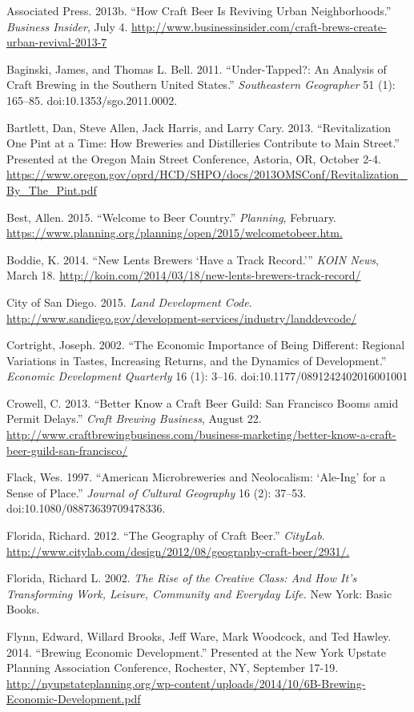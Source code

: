 \documentclass[]{article}
\begin{document}
Associated Press. 2013b. ``How Craft Beer Is Reviving Urban
Neighborhoods.'' \emph{Business Insider}, July 4.
\url{http://www.businessinsider.com/craft-brews-create-urban-revival-2013-7}

Baginski, James, and Thomas L. Bell. 2011. ``Under-Tapped?: An Analysis
of Craft Brewing in the Southern United States.'' \emph{Southeastern
Geographer} 51 (1): 165--85. doi:10.1353/sgo.2011.0002.

Bartlett, Dan, Steve Allen, Jack Harris, and Larry Cary. 2013.
``Revitalization One Pint at a Time: How Breweries and Distilleries
Contribute to Main Street.'' Presented at the Oregon Main Street
Conference, Astoria, OR, October 2-4.
\url{https://www.oregon.gov/oprd/HCD/SHPO/docs/2013OMSConf/Revitalization\_By\_The\_Pint.pdf}

Best, Allen. 2015. ``Welcome to Beer Country.'' \emph{Planning},
February. \url{https://www.planning.org/planning/open/2015/welcometobeer.htm.}

Boddie, K. 2014. ``New Lents Brewers `Have a Track Record.''' \emph{KOIN
News}, March 18.
\url{http://koin.com/2014/03/18/new-lents-brewers-track-record/}

City of San Diego. 2015. \emph{Land Development Code}.
\url{http://www.sandiego.gov/development-services/industry/landdevcode/}

Cortright, Joseph. 2002. ``The Economic Importance of Being Different:
Regional Variations in Tastes, Increasing Returns, and the Dynamics of
Development.'' \emph{Economic Development Quarterly} 16 (1): 3--16.
doi:10.1177/0891242402016001001

Crowell, C. 2013. ``Better Know a Craft Beer Guild: San Francisco Booms
amid Permit Delays.'' \emph{Craft Brewing Business}, August 22.
\url{http://www.craftbrewingbusiness.com/business-marketing/better-know-a-craft-beer-guild-san-francisco/}

Flack, Wes. 1997. ``American Microbreweries and Neolocalism: `Ale-Ing'
for a Sense of Place.'' \emph{Journal of Cultural Geography} 16 (2):
37--53. doi:10.1080/08873639709478336.

Florida, Richard. 2012. ``The Geography of Craft Beer.'' \emph{CityLab}.
\url{http://www.citylab.com/design/2012/08/geography-craft-beer/2931/.}

Florida, Richard L. 2002. \emph{The Rise of the Creative Class: And How
It's Transforming Work, Leisure, Community and Everyday Life.} New York:
Basic Books.

Flynn, Edward, Willard Brooks, Jeff Ware, Mark Woodcock, and Ted Hawley.
2014. ``Brewing Economic Development.'' Presented at the New York
Upstate Planning Association Conference, Rochester, NY, September 17-19.
\url{http://nyupstateplanning.org/wp-content/uploads/2014/10/6B-Brewing-Economic-Development.pdf}
\end{document}
